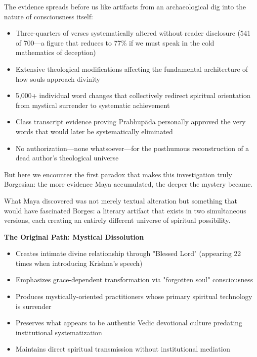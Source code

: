 \documentclass[12pt,twoside]{book}
\begin{document}
The evidence spreads before us like artifacts from an archaeological dig into the nature of consciousness itself:

\begin{itemize}
\item Three-quarters of verses systematically altered without reader disclosure (541 of 700—a figure that reduces to 77\% if we must speak in the cold mathematics of deception)
\item Extensive theological modifications affecting the fundamental architecture of how souls approach divinity
\item 5,000+ individual word changes that collectively redirect spiritual orientation from mystical surrender to systematic achievement
\item Class transcript evidence proving Prabhupāda personally approved the very words that would later be systematically eliminated
\item No authorization—none whatsoever—for the posthumous reconstruction of a dead author's theological universe
\end{itemize}

But here we encounter the first paradox that makes this investigation truly Borgesian: the more evidence Maya accumulated, the deeper the mystery became.

What Maya discovered was not merely textual alteration but something that would have fascinated Borges: a literary artifact that exists in two simultaneous versions, each creating an entirely different universe of spiritual possibility.

\textbf{\textbf{The Original Path: Mystical Dissolution}}
\begin{itemize}
\item Creates intimate divine relationship through "Blessed Lord" (appearing 22 times when introducing Krishna's speech)
\item Emphasizes grace-dependent transformation via "forgotten soul" consciousness
\item Produces mystically-oriented practitioners whose primary spiritual technology is surrender
\item Preserves what appears to be authentic Vedic devotional culture predating institutional systematization
\item Maintains direct spiritual transmission without institutional mediation
\end{itemize}
\end{document}
